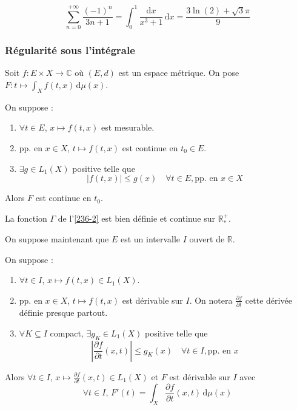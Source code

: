 	\begin{example}
		\[ \sum_{n=0}^{+\infty} \frac{(-1)^n}{3n+1} = \int_0^1 \frac{\mathrm{d}x}{x^3 + 1} \, \mathrm{d}x = \frac{3\ln(2) + \sqrt{3}\pi}{9} \]
	\end{example}
	
	\subsubsection{Régularité sous l'intégrale}
	
	
	Soit $f : E \times X \rightarrow \mathbb{C}$ où $(E, d)$ est un espace métrique. On pose $F : t \mapsto \int_X f(t, x) \, \mathrm{d}\mu(x)$.
	
	\begin{theorem}
		On suppose :
		\begin{enumerate}[label=(\roman*)]
			\item $\forall t \in E$, $x \mapsto f(t,x)$ est mesurable.
			\item pp. en $x \in X$, $t \mapsto f(t,x)$ est continue en $t_0 \in E$.
			\item $\exists g \in L_1(X)$ positive telle que
			\[ |f(t,x)| \leq g(x) \quad \forall t \in E, \text{pp. en } x \in X \]
		\end{enumerate}
		Alors $F$ est continue en $t_0$.
	\end{theorem}
	
	
	\begin{example}
		La fonction $\Gamma$ de l'\cref{236-2} est bien définie et continue sur $\mathbb{R}^+_*$.
	\end{example}
	
	
	On suppose maintenant que $E$ est un intervalle $I$ ouvert de $\mathbb{R}$.
	
	\begin{theorem}
		\label{234-4}
		On suppose :
		\begin{enumerate}[label=(\roman*)]
			\item $\forall t \in I$, $x \mapsto f(t,x) \in L_1(X)$.
			\item pp. en $x \in X$, $t \mapsto f(t,x)$ est dérivable sur $I$. On notera $\frac{\partial f}{\partial t}$ cette dérivée définie presque partout.
			\item $\forall K \subseteq I$ compact, $\exists g_K \in L_1(X)$ positive telle que
			\[ \left| \frac{\partial f}{\partial t}(x,t) \right| \leq g_K(x) \quad \forall t \in I, \text{pp. en } x \]
		\end{enumerate}
		Alors $\forall t \in I$, $x \mapsto \frac{\partial f}{\partial t}(x, t) \in L_1(X)$ et $F$ est dérivable sur $I$ avec
		\[ \forall t \in I, \, F'(t) = \int_X \frac{\partial f}{\partial t}(x, t) \, \mathrm{d}\mu(x) \]
	\end{theorem}
	
